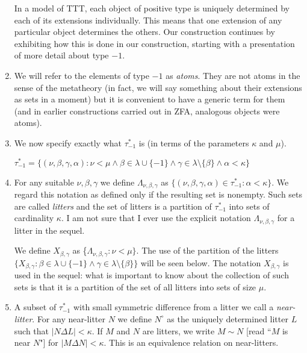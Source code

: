 \documentclass[12pt]{article}
\begin{document}
\begin{enumerate}
 In a model of TTT, each object of positive type is uniquely determined by each of its extensions individually.  This means that one extension of any particular object determines the others.
Our construction continues by exhibiting how this is done in our construction, starting with a presentation of more detail about type $-1$.

\item We will refer to the elements of type $-1$ as {\em atoms\/}.  They are not atoms in the sense of the metatheory (in fact, we will say something about their extensions as sets in a moment) but it is convenient to have a generic term for them (and in earlier constructions carried out in ZFA, analogous objects were atoms).

\item We now specify exactly what $\tau^*_{-1}$ is (in terms of the parameters $\kappa$ and $\mu$).

$\tau^*_{-1}= \{(\nu,\beta,\gamma,\alpha):\nu<\mu \wedge  \beta \in \lambda\cup \{-1\} \wedge \gamma \in \lambda \setminus \{\beta\}\wedge \alpha<\kappa\}$

\item For any suitable $\nu, \beta, \gamma$ we define $\Lambda_{\nu,\beta,\gamma}$ as $\{(\nu,\beta,\gamma,\alpha)\in \tau^*_{-1}:\alpha<\kappa\}$.  We regard this notation as defined
only if the resulting set is nonempty.  Such sets are called {\em litters} and the set of litters is a partition of $\tau^*_{-1}$ into sets of cardinality $\kappa$.  I am not sure that I ever use the explicit notation $\Lambda_{\nu,\beta,\gamma}$ for a litter in the sequel.

We define $X_{\beta,\gamma}$ as \{$\Lambda_{\nu,\beta,\gamma}:\nu<\mu\}$.  The use of the partition of the litters $\{X_{\beta,\gamma}:\beta \in \lambda\cup \{-1\} \wedge \gamma \in \lambda \setminus \{\beta\}\}$ will be seen below.  The notation $X_{\beta,\gamma}$ is used in the sequel:  what is important to know about
the collection of such sets is that it is a partition of the set of all litters into sets of size $\mu$.

\item A subset of $\tau^*_{-1}$ with small symmetric difference from a litter we call a {\em near-litter\/}.  For any near-litter $N$ we define $N^\circ$ as the uniquely determined litter $L$
such that $|N \Delta L|<\kappa$.  If $M$ and $N$ are litters, we write $M \sim N$ [read ``$M$ is near $N$"] for $|M \Delta N| < \kappa$.  This is an equivalence relation on near-litters.


\end{enumerate}
\end{document}
